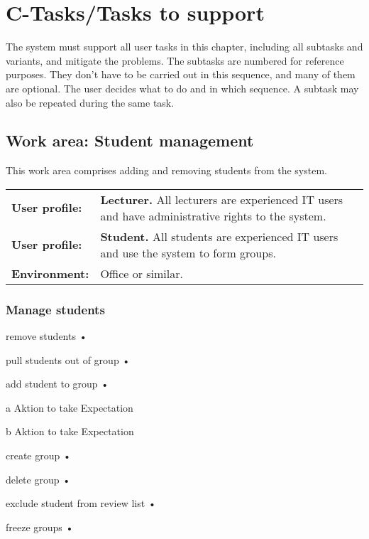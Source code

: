 \documentclass[Main]{subfiles}
\begin{document}
\chapter{C-Tasks/Tasks to support}\label{cha:C}
The system must support all user tasks in this chapter, including all subtasks and variants, and mitigate the problems. The subtasks are numbered for reference purposes. They don't have to be carried out in this sequence, and many of them are optional. The user decides what to do and in which sequence. A subtask may also be repeated during the same task.

\section{Work area: Student management}
This work area comprises adding and removing students from the system.

\begin{tabular}{l  p{13cm}}
 \textbf{User profile:} & \textbf{Lecturer.} All lecturers are experienced IT users and have administrative rights to the system. \\
 \textbf{User profile:} & \textbf{Student.} All students are experienced IT users and use the system to form groups.  \\
 \textbf{Environment:} & Office or similar.
\end{tabular}

\subsection{Manage students}\label{sec:ManageStudents}

\begin{DataIntro}
\end{DataIntro}


\begin{TaskTable}

\Record
{remove students}
{•}
{}

\Record
{pull students out of group}
{•}
{}

\Record
{add student to group}
{•}
{}


\RecordAddi
{a}
{Aktion to take}
{Expectation}
{}

\RecordAddi
{b}
{Aktion to take}
{Expectation}
{}

\Record
{create group}
{•}
{}

\Record
{delete group}
{•}
{}

\Record
{exclude student from review list}
{•}
{}

\Record
{freeze groups}
{•}
{}
\end{TaskTable}
\end{document}
